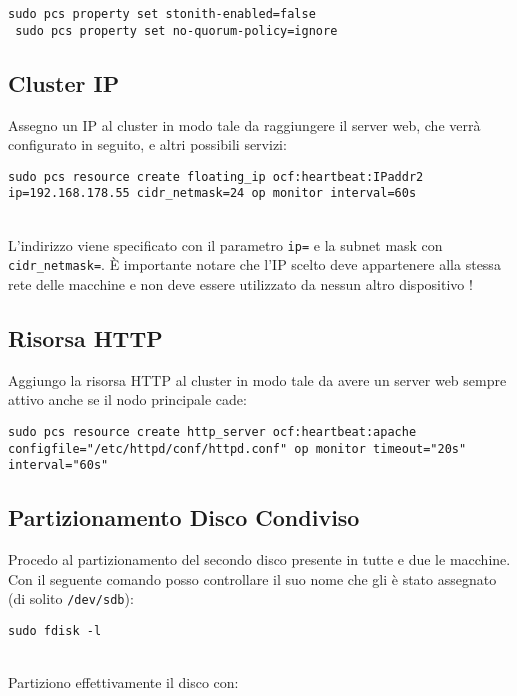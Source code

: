 \begin{lstlisting}[style=cmd]
 sudo pcs property set stonith-enabled=false
 sudo pcs property set no-quorum-policy=ignore
\end{lstlisting}

\subsection{Cluster IP}

Assegno un IP al cluster in modo tale da raggiungere il server web, che verr\`{a} configurato in seguito, e altri possibili servizi:

\begin{lstlisting}[style=cmd]
 sudo pcs resource create floating_ip ocf:heartbeat:IPaddr2 ip=192.168.178.55 cidr_netmask=24 op monitor interval=60s
\end{lstlisting}
\ \\
L'indirizzo viene specificato con il parametro \lstinline[style=cmd]|ip=| e la subnet mask con \lstinline[style=cmd]|cidr_netmask=|. \`{E} importante notare che l'IP scelto deve appartenere alla stessa rete delle macchine e non deve essere utilizzato da nessun altro dispositivo !

\subsection{Risorsa HTTP}

Aggiungo la risorsa HTTP al cluster in modo tale da avere un server web sempre attivo anche se il nodo principale cade:

\begin{lstlisting}[style=cmd]
 sudo pcs resource create http_server ocf:heartbeat:apache configfile="/etc/httpd/conf/httpd.conf" op monitor timeout="20s" interval="60s"
\end{lstlisting}

\subsection{Partizionamento Disco Condiviso}
\label{sec:partizione}

Procedo al partizionamento del secondo disco presente in tutte e due le macchine.\\
Con il seguente comando posso controllare il suo nome che gli \`{e} stato assegnato (di solito \lstinline[style=cmd]|/dev/sdb|):

\begin{lstlisting}[style=cmd]
 sudo fdisk -l
\end{lstlisting}
\ \\
Partiziono effettivamente il disco con:

